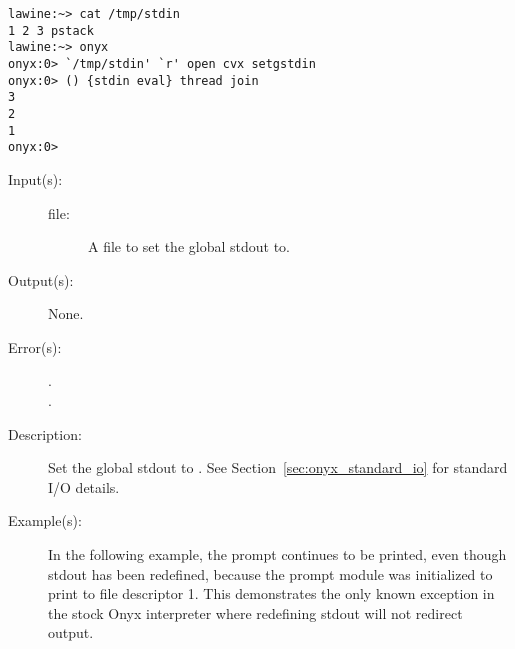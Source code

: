 \begin{description}
\begin{description}
\begin{verbatim}
lawine:~> cat /tmp/stdin
1 2 3 pstack
lawine:~> onyx
onyx:0> `/tmp/stdin' `r' open cvx setgstdin
onyx:0> () {stdin eval} thread join
3
2
1
onyx:0>
		\end{verbatim}
	\end{description}
\label{systemdict:setgstdout}
\item[{\onyxop{file}{setgstdout}{--}}: ]
	\begin{description}\item[]
	\item[Input(s): ]
		\begin{description}\item[]
		\item[file: ]
			A file to set the global stdout to.
		\end{description}
	\item[Output(s): ] None.
	\item[Error(s): ]
		\begin{description}\item[]
		\item[.]
		\item[.]
		\end{description}
	\item[Description: ]
		Set the global stdout to .  See
		Section~\ref{sec:onyx_standard_io} for standard I/O details.
	\item[Example(s): ]
		In the following example, the prompt continues to be printed,
		even though stdout has been redefined, because the prompt module
		was initialized to print to file descriptor 1.  This
		demonstrates the only known exception in the stock Onyx
		interpreter where redefining stdout will not redirect output.
\begin{verbatim}


\end{verbatim}
\end{description}
\end{description}
